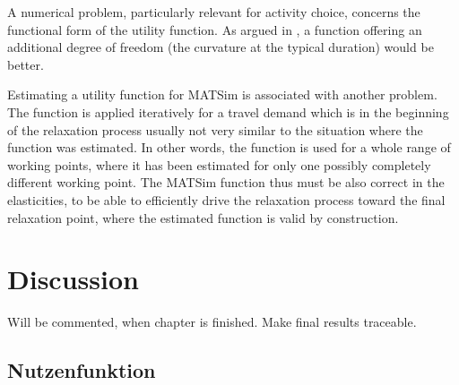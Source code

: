 A numerical problem, particularly relevant for activity choice, concerns the functional form of the utility function. As argued in \citet[][p.33]{MATSim_Userguide_2014}, a function offering an additional degree of freedom (the curvature at the typical duration) would be better.

Estimating a utility function for MATSim is associated with another problem. The function is applied iteratively for a travel demand which is in the beginning of the relaxation process usually not very similar to the situation where the function was estimated. In other words, the function is used for a whole range of working points, where it has been estimated for only one  possibly completely different working point. The MATSim function thus must be also correct in the elasticities, to be able to efficiently drive the relaxation process toward the final relaxation point, where the estimated function is valid by construction. 

\section{Discussion}
\label{sec:discussion_scoring}
Will be commented, when chapter is finished. Make final results traceable.

\subsection{Nutzenfunktion}
\label{sec:utfd}



